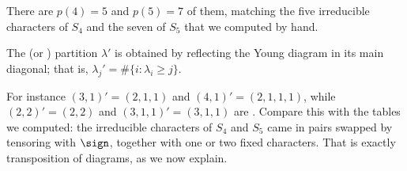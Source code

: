 \begin{center}
\end{center}
\vspace{0.5em}

There are $p(4) = 5$ and $p(5) = 7$ of them, matching the five irreducible characters of $S_4$ and the seven of $S_5$ that we computed by hand.

\begin{definition}
	The  (or ) partition $\lambda'$ is obtained by reflecting the Young diagram in its main diagonal; that is, $\lambda_j' = \#\{i : \lambda_i \geq j\}$.
\end{definition}

For instance $(3,1)' = (2,1,1)$ and $(4,1)' = (2,1,1,1)$, while $(2,2)' = (2,2)$ and $(3,1,1)' = (3,1,1)$ are . Compare this with the tables we computed: the irreducible characters of $S_4$ and $S_5$ came in pairs swapped by tensoring with $\sign$, together with one or two fixed characters. That is exactly transposition of diagrams, as we now explain.

